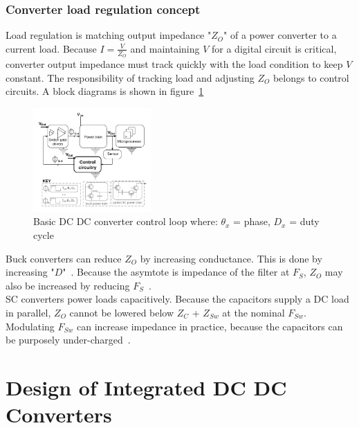 \documentclass[letterpaper,twocolumn,10pt]{article}
\begin{document}
\subsubsection{Converter load regulation concept}
Load regulation is matching output impedance "$Z_O$" of a power converter to a current load. Because $I= \frac{V}{Z_O}$ and maintaining $V$ for a digital circuit is critical, converter output impedance must track quickly with the load condition to keep $V$ constant. The responsibility of tracking load and adjusting $Z_O$ belongs to control circuits. A block diagrams is shown in figure~\ref{ControlCKBlockDiags}\\
\begin{figure}[here]
\includegraphics[width=0.4\textwidth]{BasicControlBlockDiag}
\caption{Basic DC DC converter control loop where:
$\theta_x$ = phase, $D_x$ = duty cycle}
\label{ControlCKBlockDiags}
\end{figure}
Buck converters can reduce $Z_O$ by increasing conductance. This is done by increasing "$D$"~\cite{Kurson2006}. Because the asymtote is impedance of the filter at $F_S$, $Z_O$ may also be increased by reducing $F_S$~\cite{Alghamdi2012}.\\ %
SC converters power loads capacitively. Because the capacitors supply a DC load in parallel, $Z_O$ cannot be lowered below $Z_C$ + $Z_{Sw}$ at the nominal $F_{Sw}$. Modulating $F_{Sw}$ can increase impedance in practice, because the capacitors can be purposely under-charged~\cite{Seeman2008}.\\

\section{Design of Integrated DC DC Converters} \label{DesignOfIntegratedDCDCConverters}
\end{document}

